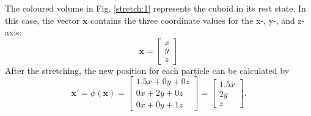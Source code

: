 The coloured volume in Fig. \ref{stretch:1} represents the cuboid in its rest state. In this case, the vector $\mathbf{x}$ contains the three coordinate values for the x-, y-, and z-axis:
\[
	\mathbf{x} = \begin{bmatrix} x \\ y \\ z\end{bmatrix}
\]
After the stretching, the new position for each particle can be calculated by
\begin{equation} \label{eq:example_phi}
	\mathbf{x}' = \phi (\mathbf{x}) = \begin{bmatrix} 1.5x + 0y + 0z	 \\ 0x + 2y + 0z \\ 0x +0y + 1z \end{bmatrix} = \begin{bmatrix} 1.5x \\ 2y \\ z \end{bmatrix}.
\end{equation}

